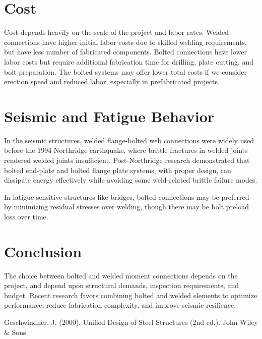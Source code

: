 \documentclass[12pt,a4paper]{article}
\begin{document}
\section{Cost}
Cost depends heavily on the scale of the project and labor rates. Welded connections have higher initial labor costs due to skilled welding requirements, but have less number of  fabricated components. Bolted connections have lower labor costs but require additional fabrication time for drilling, plate cutting, and bolt preparation. The bolted systems may offer lower total costs if we consider erection speed and reduced labor, especially in prefabricated projects.

\section{Seismic and Fatigue Behavior}
In the seismic structures, welded flange-bolted web connections were widely used before the 1994 Northridge earthquake, where brittle fractures in welded joints rendered welded joints insufficient. Post-Northridge research demonstrated that bolted end-plate and bolted flange plate systems, with proper design, can dissipate energy effectively while avoiding some weld-related brittle failure modes.

In fatigue-sensitive structures like bridges, bolted connections may be preferred by minimizing residual stresses over welding, though there may be bolt preload loss over time.


\section{Conclusion}
The choice between bolted and welded moment connections depends on the project, and depend upon structural demands, inspection requirements, and budget. Recent research favors combining bolted and welded elements to optimize performance, reduce fabrication complexity, and improve seismic resilience. 
\begin{thebibliography}{99}

Geschwindner, J. (2000). Unified Design of Steel Structures (2nd ed.). John Wiley & Sons.


\end{thebibliography}
\end{document}
